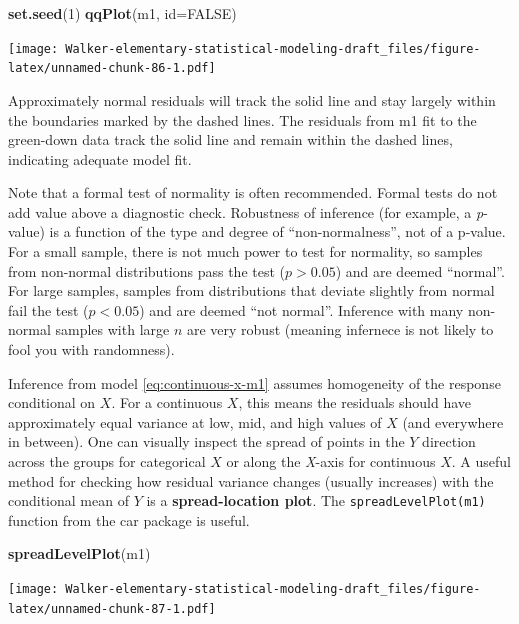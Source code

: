 \documentclass[]{book}
\newenvironment{Shaded}{\begin{snugshade}}{\end{snugshade}}
\newcommand{\DataTypeTok}[1]{\textcolor[rgb]{0.13,0.29,0.53}{#1}}
\newcommand{\DecValTok}[1]{\textcolor[rgb]{0.00,0.00,0.81}{#1}}
\newcommand{\KeywordTok}[1]{\textcolor[rgb]{0.13,0.29,0.53}{\textbf{#1}}}
\newcommand{\NormalTok}[1]{#1}
\newcommand{\OtherTok}[1]{\textcolor[rgb]{0.56,0.35,0.01}{#1}}
\begin{document}
\begin{Shaded}
\begin{Highlighting}[]
\KeywordTok{set.seed}\NormalTok{(}\DecValTok{1}\NormalTok{)}
\KeywordTok{qqPlot}\NormalTok{(m1, }\DataTypeTok{id=}\OtherTok{FALSE}\NormalTok{)}
\end{Highlighting}
\end{Shaded}

\texttt{[image: Walker-elementary-statistical-modeling-draft\_files/figure-latex/unnamed-chunk-86-1.pdf]}

Approximately normal residuals will track the solid line and stay largely within the boundaries marked by the dashed lines. The residuals from m1 fit to the green-down data track the solid line and remain within the dashed lines, indicating adequate model fit.

Note that a formal test of normality is often recommended. Formal tests do not add value above a diagnostic check. Robustness of inference (for example, a \emph{p}-value) is a function of the type and degree of ``non-normalness'', not of a p-value. For a small sample, there is not much power to test for normality, so samples from non-normal distributions pass the test (\(p > 0.05\)) and are deemed ``normal''. For large samples, samples from distributions that deviate slightly from normal fail the test (\(p < 0.05\)) and are deemed ``not normal''. Inference with many non-normal samples with large \(n\) are very robust (meaning infernece is not likely to fool you with randomness).

Inference from model \eqref{eq:continuous-x-m1} assumes homogeneity of the response conditional on \(X\). For a continuous \(X\), this means the residuals should have approximately equal variance at low, mid, and high values of \(X\) (and everywhere in between). One can visually inspect the spread of points in the \(Y\) direction across the groups for categorical \(X\) or along the \emph{X}-axis for continuous \(X\). A useful method for checking how residual variance changes (usually increases) with the conditional mean of \(Y\) is a \textbf{spread-location plot}. The \texttt{spreadLevelPlot(m1)} function from the car package is useful.

\begin{Shaded}
\begin{Highlighting}[]
\KeywordTok{spreadLevelPlot}\NormalTok{(m1)}
\end{Highlighting}
\end{Shaded}

\texttt{[image: Walker-elementary-statistical-modeling-draft\_files/figure-latex/unnamed-chunk-87-1.pdf]}
\end{document}
